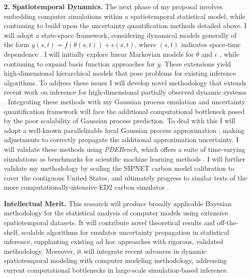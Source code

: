 \documentclass[11pt]{article}
\begin{document}
 \textbf{2. Spatiotemporal Dynamics.}
 The next phase of my proposal involves embedding computer simulations within a spatiotemporal statistical model, while continuing to build upon the uncertainty quantification methods detailed above. I will adopt a state-space framework, considering dynamical models generally of the form $y(s, t) = f(\theta(s, t)) + \epsilon(s, t)$, where $(s, t)$ indicates space-time dependence \cite{Wikle, Hefley}. I will initially explore linear Markovian models for $\theta$ and $\epsilon$ \cite{Hefley}, while continuing to expand basis function approaches for $y$. 
These extensions yield high-dimensional hierarchical models that pose problems for existing inference algorithms. To address these issues I will develop novel methodology that extends recent work on inference for high-dimensional partially observed dynamic systems \cite{Park}. Integrating these methods with my Gaussian process emulation and uncertainty quantification framework will face the additional computational bottleneck posed by the poor scalability of Gaussian process prediction. To deal with this I will adopt a well-known parallelizable local Gaussian process approximation \cite{Gramacy}, making adjustments to correctly propagate the additional approximation uncertainty. I will validate these methods using \textit{PDEBench}, which offers a suite of time-varying simulations as benchmarks for scientific machine learning methods \cite{Takamoto}. I will further validate my methodology by scaling the SIPNET carbon model calibration to cover the contiguous United States, and ultimately progress to similar tests of the more computationally-intensive ED2 carbon simulator \cite{Fer, Fer2}.

\noindent
\textbf{Intellectual Merit.} This research will produce broadly applicable Bayesian methodology for the statistical analysis of computer models using extensive spatiotemporal datasets. It will contribute novel theoretical results and off-the-shelf, scalable algorithms for emulator uncertainty propagation in statistical inference, supplanting existing ad hoc approaches with rigorous, validated methodology. Moreover, it will integrate recent advances in dynamic spatiotemporal modeling with computer modeling methodology, addressing current computational bottlenecks in large-scale simulation-based inference.
\end{document}
